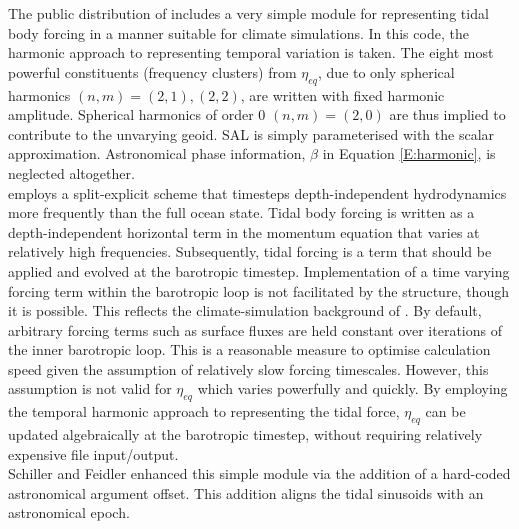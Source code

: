 The public distribution of \MOM{} includes a very simple module for representing tidal body forcing in a manner suitable for climate simulations. 
In this code, the harmonic approach to representing temporal variation is taken.   The eight most powerful constituents (frequency clusters) from $\eta_{eq}$, due to only spherical harmonics $(n,m) = (2,1) , (2,2)$, are written with fixed harmonic amplitude.  
Spherical harmonics of order 0 $(n,m) = (2,0)$ are thus implied to contribute to the unvarying geoid.  SAL is simply parameterised with the scalar approximation.   
Astronomical phase information, $\beta$ in Equation \ref{E:harmonic}, is neglected altogether.\\
\MOM{} employs a split-explicit scheme that timesteps depth-independent hydrodynamics more frequently than the full ocean state.  Tidal body forcing is written as a depth-independent horizontal term in the momentum equation that varies at relatively high frequencies.  Subsequently, tidal forcing is a term that should be applied and evolved at the barotropic timestep.
Implementation of a time varying forcing term within the barotropic loop is not facilitated by the \MOM{} structure, though it is possible.  This reflects the climate-simulation background of \MOM{}.  
By default, arbitrary forcing terms such as surface fluxes are held constant over iterations of the inner barotropic loop.  This is a reasonable measure to optimise calculation speed given the assumption of relatively slow forcing timescales.   
However, this assumption is not valid for $\eta_{eq}$ which varies powerfully and quickly.
By employing the temporal harmonic approach to representing the tidal force, $\eta_{eq}$ can be updated algebraically at the barotropic timestep, without requiring relatively expensive file input/output.\\

Schiller and Feidler \citep{Schiller:2007gk} enhanced this simple module via the addition of a hard-coded astronomical argument offset.   This addition aligns the tidal sinusoids with an astronomical epoch.\\



